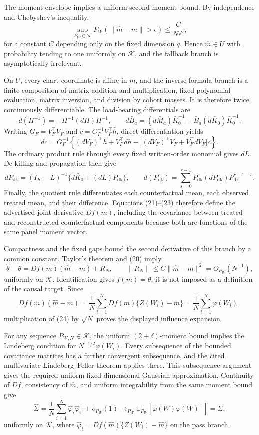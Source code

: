 The moment envelope implies a uniform second-moment bound.  By independence and Chebyshev's inequality,
\[
 \sup_{P_W\in\mathcal K}P_W\!\left(\|\widehat m-m\|>\epsilon\right)
 \le \frac{C}{N\epsilon^2},                                  \tag{20}
\]
for a constant \(C\) depending only on the fixed dimension \(q\).  Hence \(\widehat m\in U\) with probability tending to one uniformly on \(\mathcal K\), and the fallback branch is asymptotically irrelevant.

On \(U\), every chart coordinate is affine in \(m\), and the inverse-formula branch is a finite composition of matrix addition and multiplication, fixed polynomial evaluation, matrix inversion, and division by cohort masses.  It is therefore twice continuously differentiable.  The load-bearing differentials are
\[
 d(H^{-1})=-H^{-1}(dH)H^{-1},
 \qquad
 d\bar B_a=(d\bar M_a)\bar K_0^{-1}-\bar B_a(d\bar K_0)\bar K_0^{-1}. \tag{21}
\]
Writing \(G_F=V_F^{\top}V_F\) and \(c=G_F^{-1}V_F^{\top}\bar h\), direct differentiation yields
\[
 dc=G_F^{-1}\!\left\{(dV_F)^{\top}\bar h+V_F^{\top}d\bar h
 -\bigl[(dV_F)^{\top}V_F+V_F^{\top}dV_F\bigr]c\right\}.       \tag{22}
\]
The ordinary product rule through every fixed written-order monomial gives \(dL\).  De-killing and propagation then give
\[
 dP_{\mathrm{dk}}=(I_K-L)^{-1}\{d\bar K_0+(dL)P_{\mathrm{dk}}\},
 \qquad
 d(P_{\mathrm{dk}}^r)=\sum_{s=0}^{r-1}P_{\mathrm{dk}}^s(dP_{\mathrm{dk}})P_{\mathrm{dk}}^{r-1-s}. \tag{23}
\]
Finally, the quotient rule differentiates each counterfactual mean, each observed treated mean, and their difference.  Equations (21)--(23) therefore define the advertised joint derivative \(Df(m)\), including the covariance between treated and reconstructed counterfactual components because both are functions of the same panel moment vector.

Compactness and the fixed gaps bound the second derivative of this branch by a common constant.  Taylor's theorem and (20) imply
\[
 \widehat\theta-\theta
 =Df(m)(\widehat m-m)+R_N,
 \qquad
 \|R_N\|\le C\|\widehat m-m\|^2=O_{P_W}(N^{-1}),             \tag{24}
\]
uniformly on \(\mathcal K\).  Identification gives \(f(m)=\theta\); it is not imposed as a definition of the causal target.  Since
\[
 Df(m)(\widehat m-m)=\frac1N\sum_{i=1}^NDf(m)\{Z(W_i)-m\}
 =\frac1N\sum_{i=1}^N\varphi(W_i),                            \tag{25}
\]
multiplication of (24) by \(\sqrt N\) proves the displayed influence expansion.

For any sequence \(P_{W,N}\in\mathcal K\), the uniform \((2+\delta)\)-moment bound implies the Lindeberg condition for \(N^{-1/2}\varphi(W_i)\).  Every subsequence of the bounded covariance matrices has a further convergent subsequence, and the cited multivariate Lindeberg--Feller theorem applies there.  This subsequence argument gives the required uniform fixed-dimensional Gaussian approximation.  Continuity of \(Df\), consistency of \(\widehat m\), and uniform integrability from the same moment bound give
\[
 \widehat\Sigma
 =\frac1N\sum_{i=1}^N\widehat\varphi_i\widehat\varphi_i^{\top}+o_{P_W}(1)
 \longrightarrow_{P_W}\mathbb E_{P_W}[\varphi(W)\varphi(W)^{\top}]=\Sigma, \tag{26}
\]
uniformly on \(\mathcal K\), where \(\widehat\varphi_i=Df(\widehat m)\{Z(W_i)-\widehat m\}\) on the pass branch.

